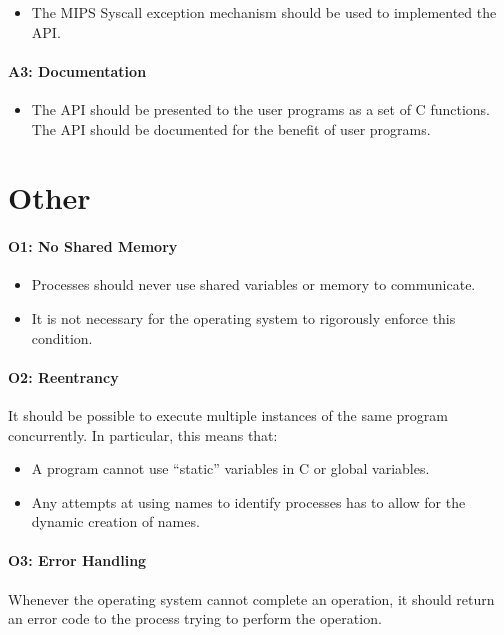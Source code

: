 \begin{itemize}
  \item The MIPS Syscall exception mechanism should be used to implemented the API.
\end{itemize}

\paragraph{A3: Documentation}

\begin{itemize}
  \item 
	 The API should be presented to the user programs as a set of C functions.
	 The API should be documented for the benefit of user programs.
\end{itemize}

\section{Other}

\paragraph{O1: No Shared Memory}

\begin{itemize}
  \item Processes should never use shared variables or memory to communicate.
  \item  It is not necessary for the operating system to rigorously enforce this condition.
\end{itemize}

\paragraph{O2: Reentrancy}

It should be possible to execute multiple instances of the same program concurrently. In particular, this means that:

\begin{itemize}
  \item A program cannot use ``static'' variables in C or global variables.
  \item  Any attempts at using names to identify processes has to allow for the dynamic creation of names.
\end{itemize}

\paragraph{O3: Error Handling}
Whenever the operating system cannot complete an operation, it should return an error code to the process trying to perform the operation.

